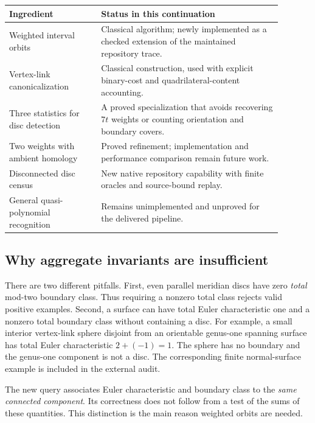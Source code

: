 \begin{center}
\begin{tabular}{>{\raggedright\arraybackslash}p{0.30\linewidth}>{\raggedright\arraybackslash}p{0.59\linewidth}}
\toprule
Ingredient & Status in this continuation \\
\midrule
Weighted interval orbits & Classical algorithm; newly implemented as a
checked extension of the maintained repository trace. \\
Vertex-link canonicalization & Classical construction, used with explicit
binary-cost and quadrilateral-content accounting. \\
Three statistics for disc detection & A proved specialization that avoids
recovering $7t$ weights or counting orientation and boundary covers. \\
Two weights with ambient homology & Proved refinement; implementation and
performance comparison remain future work. \\
Disconnected disc census & New native repository capability with finite
oracles and source-bound replay. \\
General quasi-polynomial recognition & Remains unimplemented and unproved
for the delivered pipeline. \\
\bottomrule
\end{tabular}
\end{center}

\subsection{Why aggregate invariants are insufficient}

There are two different pitfalls. First, even parallel meridian discs have
zero \emph{total} mod-two boundary class. Thus requiring a nonzero total
class rejects valid positive examples. Second, a surface can have total
Euler characteristic one and a nonzero total boundary class without containing
a disc. For example, a small interior vertex-link sphere disjoint from an
orientable genus-one spanning surface has total Euler characteristic
$2+(-1)=1$. The sphere has no boundary and the genus-one component is not a
disc. The corresponding finite normal-surface example is included in the
external audit.

The new query associates Euler characteristic and boundary class to the
\emph{same connected component}. Its correctness does not follow from a
test of the sums of these quantities. This distinction is the main reason
weighted orbits are needed.

